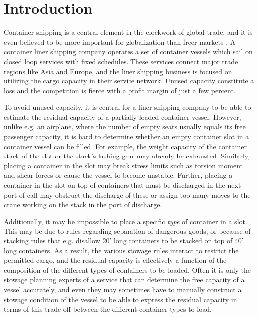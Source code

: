 %

%
\section{Introduction}
Container shipping is a central element in the clockwork of global trade, and it is even believed to be more important for globalization than freer markets \cite{EC13}. A container liner shipping company operates a set of container vessels which sail on closed loop services with fixed schedules. These services connect major trade regions like Asia and Europe, and the liner shipping business is focused on utilizing the cargo capacity in their service network. Unused capacity constitute a loss and the competition is fierce with a profit margin of just a few percent.  

To avoid unused capacity, it is central for a liner shipping company to be able to estimate the residual capacity of a partially loaded container vessel. However, unlike e.g. an airplane, where the number of empty seats usually equals its free passenger capacity, it is hard to determine whether an empty container slot in a container vessel can be filled.   
For example, the weight capacity of the container stack of the slot or the stack's lashing gear may already be exhausted. 
Similarly, placing a container in the slot may break stress limits such as torsion moment and shear forces or cause the vessel to become unstable.
Further, placing a container in the slot on top of containers that must be discharged in the next port of call may obstruct the discharge of these or assign too many moves to the crane working on the stack in the port of discharge. 

Additionally,  
it may be impossible to place a specific \emph{type} of container in a slot. This may be due to rules regarding separation of dangerous goods, or because of stacking rules that e.g. disallow 20' long containers to be stacked on top of 40' long containers. 
As a result, the various stowage rules interact to restrict the permitted cargo, and the residual capacity is  effectively a function of the composition of the different types of containers to be loaded.
Often it is only the stowage planning experts of a service that can determine the free capacity of a vessel accurately, and even they may sometimes have to manually construct a stowage condition of the vessel to be able to express the residual capacity in terms of this trade-off between the different container types to load.


